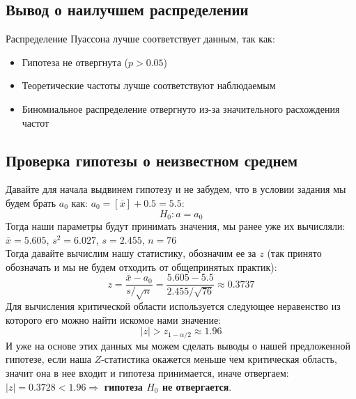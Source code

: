 \documentclass[12pt]{article}
\begin{document}
\subsection{Вывод о наилучшем распределении}
Распределение Пуассона лучше соответствует данным, так как:
\begin{itemize}
    \item Гипотеза не отвергнута ($p > 0.05$)
    \item Теоретические частоты лучше соответствуют наблюдаемым
    \item Биномиальное распределение отвергнуто из-за значительного расхождения частот
\end{itemize}

\subsection{Проверка гипотезы о неизвестном среднем}
Давайте для начала выдвинем гипотезу и не забудем, что в условии задания мы будем брать $a_0$ как: $a_0 = [\overline{x}] + 0.5 = 5.5$:\\
$$H_0: a = a_0$$
Тогда наши параметры будут принимать значения, мы ранее уже их вычисляли:
$\bar{x} = 5.605$, $s^2 = 6.027$, $s = 2.455$, $n = 76$ \\
Тогда давайте вычислим нашу статистику, обозначим ее за $z$ (так принято обозначать и мы не будем отходить от общепринятых практик):
\[
z = \frac{\bar{x} - a_0}{s/\sqrt{n}} = \frac{5.605 - 5.5}{2.455/\sqrt{76}} \approx 0.3737
\]
Для вычисления критической области используется следующее неравенство из которого его можно найти искомое нами значение:
$$|z| > z_{1-\alpha/2} \approx 1.96$$
И уже на основе этих данных мы можем сделать выводы о нашей предложенной гипотезе, если наша $Z$-статистика окажется меньше чем критическая область, значит она в нее входит и гипотеза принимается, иначе отвергаем:\\
$|z| = 0.3728 < 1.96 \Rightarrow$ \textbf{гипотеза $H_0$ не отвергается}.
\end{document}

